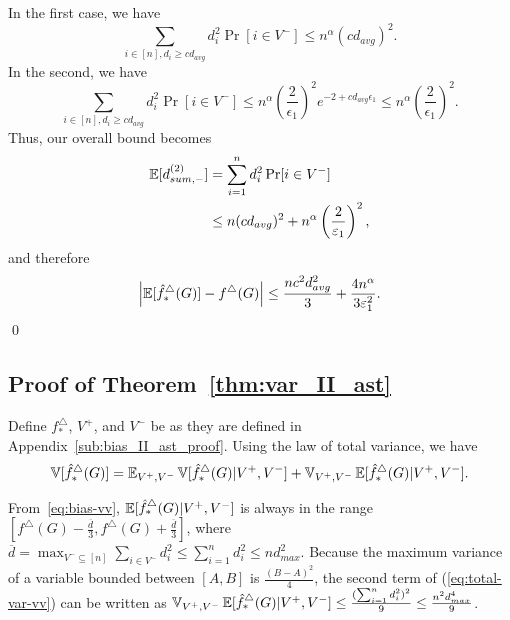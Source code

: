 In the first case, we have
\[
  \sum_{i \in [n], d_i \geq c d_{avg}} d_i^2 \Pr[i \in V^-] \leq n^\alpha
  (cd_{avg})^2.
\]
In the second, we have
\[
  \sum_{i \in [n], d_i \geq c d_{avg}} d_i^2 \Pr[i \in V^-] \leq
  n^\alpha\left(\frac{2}{\epsilon_1}\right)^2 e^{-2 + cd_{avg} \epsilon_1} \leq
  n^\alpha\left(\frac{2}{\epsilon_1}\right)^2.
\]
Thus, our overall bound becomes 
\begin{align*}
  \operatorname{\mathbb{E}}[d_{sum,-}^{(2)}] &= \sum_{i = 1}^n d_i^2 \Pr[i \in V^-] \\
  &\leq n(c d_{avg})^2 + n^\alpha \left(\frac{2}{\varepsilon_1}\right)^2,
\end{align*}
and therefore 
\[
  \left|\operatorname{\mathbb{E}}[\hat{f}^\triangle_*(G)] -
  f^\triangle(G)\right| \leq
  \frac{n c^2 d_{avg}^2}{3}  + \frac{4 n^\alpha}{3 \varepsilon_1^2}.
\]\qed

\subsection{Proof of Theorem~\ref{thm:var_II_ast}}
\label{sub:var_II_ast_proof}

Define $f^\triangle_*$, $V^+$, and $V^-$ be as they are defined in
Appendix~\ref{sub:bias_II_ast_proof}. 
Using the law of total variance, we have
\begin{equation}\label{eq:total-var-vv}
  \operatorname{\mathbb{V}}[\hat{f}_*^\triangle(G)] = \operatorname{\mathbb{E}}_{V^+,V^-}\operatorname{\mathbb{V}}[\hat{f}_*^\triangle(G)|V^+,V^-] +
  \operatorname{\mathbb{V}}_{V^+,V^-}\operatorname{\mathbb{E}}[\hat{f}_*^\triangle(G)|V^+,V^-].
\end{equation}

From~\eqref{eq:bias-vv}, $\operatorname{\mathbb{E}}[\hat{f}_*^\triangle(G)|V^+,V^-]$ is always in the
range $[f^\triangle(G) - \frac{\overline{d}}{3}, f^\triangle(G) + \frac{
  \overline{d}}{3}]$, where $\overline{d} = 
\max_{V^- \subseteq [n]} \sum_{i \in V^-} d_i^2 \leq \sum_{i=1}^n d_i^2 \leq n d_{max}^2$.
Because the maximum variance of a variable bounded between $[A,B]$ is
$\frac{(B-A)^2}{4}$, 
the second term of (\ref{eq:total-var-vv}) can be written as 
$\operatorname{\mathbb{V}}_{V^+,V^-}\operatorname{\mathbb{E}}[\hat{f}_*^\triangle(G)|V^+,V^-] 
\leq \allowbreak \frac{(\sum_{i=1}^n d_i^2)^2}{9} \leq \frac{n^2 d_{max}^4}{9} $.

